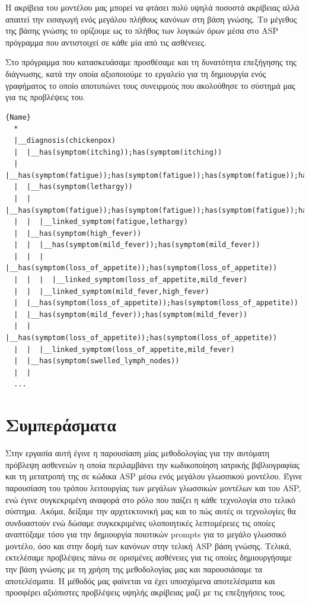\documentclass[12pt]{extarticle}
\begin{document}
Η ακρίβεια του μοντέλου μας μπορεί να φτάσει πολύ υψηλά ποσοστά ακρίβειας αλλά απαιτεί την εισαγωγή ενός μεγάλου πλήθους κανόνων στη βάση γνώσης.
Το μέγεθος της βάσης γνώσης το ορίζουμε ως το πλήθος των λογικών όρων μέσα 
στο ASP πρόγραμμα που αντιστοιχεί σε κάθε μία από τις ασθένειες.

Στο πρόγραμμα που κατασκευάσαμε προσθέσαμε και τη δυνατότητα 
επεξήγησης της διάγνωσης, κατά την οποία αξιοποιούμε 
το εργαλείο  για τη δημιουργία ενός γραφήματος
το οποίο αποτυπώνει τους συνειρμούς που ακολούθησε το σύστημά 
μας για τις προβλέψεις του.

\begin{lstlisting}[caption={Μέρος της επεξήγησης για τη διάγνωση της ασθένειας chickenpox. Μέσα στο διάγραμμα δέντρο φαίνονται οι συσχετίσεις μεταξύ των διαφορετικών συμπτωμάτων 
και το πώς το σύστημά μας καταλήγει στα συμπεράσματά του.}, label=lst:terms]{Name}
  *
  |__diagnosis(chickenpox)
  |  |__has(symptom(itching));has(symptom(itching))
  |  |__has(symptom(fatigue));has(symptom(fatigue));has(symptom(fatigue));has(symptom(fatigue));has(symptom(fatigue))
  |  |__has(symptom(lethargy))
  |  |  |__has(symptom(fatigue));has(symptom(fatigue));has(symptom(fatigue));has(symptom(fatigue));has(symptom(fatigue))
  |  |  |__linked_symptom(fatigue,lethargy)
  |  |__has(symptom(high_fever))
  |  |  |__has(symptom(mild_fever));has(symptom(mild_fever))
  |  |  |  |__has(symptom(loss_of_appetite));has(symptom(loss_of_appetite))
  |  |  |  |__linked_symptom(loss_of_appetite,mild_fever)
  |  |  |__linked_symptom(mild_fever,high_fever)
  |  |__has(symptom(loss_of_appetite));has(symptom(loss_of_appetite))
  |  |__has(symptom(mild_fever));has(symptom(mild_fever))
  |  |  |__has(symptom(loss_of_appetite));has(symptom(loss_of_appetite))
  |  |  |__linked_symptom(loss_of_appetite,mild_fever)
  |  |__has(symptom(swelled_lymph_nodes))
  |  |  
  ...
\end{lstlisting}

\section{Συμπεράσματα}

Στην εργασία αυτή έγινε η παρουσίαση μίας μεθοδολογίας για την αυτόματη πρόβλεψη ασθενειών 
η οποία περιλαμβάνει την κωδικοποίηση ιατρικής βιβλιογραφίας και τη μετατροπή της σε κώδικα 
ASP μέσω ενός μεγάλου γλωσσικού μοντέλου.
Έγινε παρουσίαση του τρόπου λειτουργίας των μεγάλων γλωσσικών μοντέλων και του ASP, 
ενώ έγινε συγκεκριμένη αναφορά στο ρόλο που παίζει η κάθε τεχνολογία στο τελικό σύστημα.
Ακόμα, δείξαμε την αρχιτεκτονική μας και το πώς αυτές οι τεχνολογίες θα συνδυαστούν ενώ
δώσαμε συγκεκριμένες υλοποιητικές λεπτομέρειες τις οποίες αναπτύξαμε τόσο
για την δημιουργία ποιοτικών prompts για το μεγάλο γλωσσικό μοντέλο, όσο και
στην δομή των κανόνων στην τελική ASP βάση γνώσης.
Τελικά, εκτελέσαμε προβλέψεις πάνω σε ορισμένες ασθένειες για τις οποίες δημιουργήσαμε την
βάση γνώσης με τη χρήση της μεθοδολογίας μας και παρουσιάσαμε τα αποτελέσματα.
Η μέθοδός μας φαίνεται να έχει υποσχόμενα αποτελέσματα και προσφέρει αξιόπιστες προβλέψεις υψηλής ακρίβειας
μαζί με τις επεξηγήσεις τους.
\end{document}
